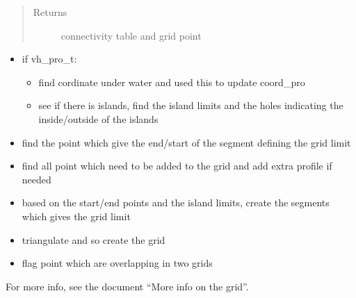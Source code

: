 \documentclass[letterpaper,10pt,english]{sphinxmanual}
\begin{document}
\begin{fulllineitems}
\begin{quote}
\begin{description}
\begin{itemize}
\end{itemize}

\item[{Returns}] \leavevmode
connectivity table and grid point

\end{description}\end{quote}

\begin{itemize}
\item {} 
if vh\_pro\_t:
\begin{itemize}
\item {} 
find cordinate under water and used this to update coord\_pro

\item {} 
see if there is islands, find the island limits and the holes indicating the inside/outside of the islands

\end{itemize}

\item {} 
find the point which give the end/start of the segment defining the grid limit

\item {} 
find all point which need to be added to the grid and add extra profile if needed

\item {} 
based on the start/end points and the island limits, create the segments which gives the grid limit

\item {} 
triangulate and so create the grid

\item {} 
flag point which are overlapping in two grids

\end{itemize}

For more info, see the document ``More info on the grid''.

\end{fulllineitems}

\end{document}
